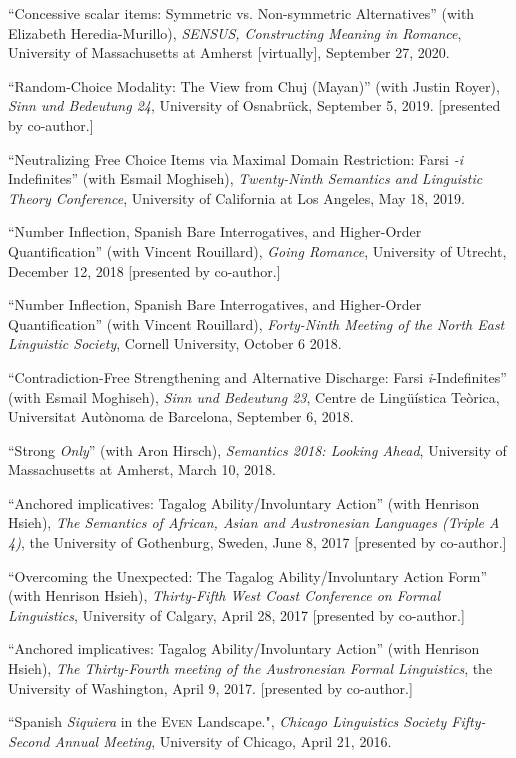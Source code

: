 \documentclass[11pt]{article}
\begin{document}
``Concessive scalar items: Symmetric vs. Non-symmetric Alternatives'' (with Elizabeth Heredia-Murillo), \textit{SENSUS, Constructing Meaning in Romance}, University of Massachusetts at Amherst [virtually], September 27, 2020.

``Random-Choice Modality: The View from Chuj (Mayan)'' (with Justin Royer), \textit{Sinn und Bedeutung 24}, University of Osnabr\"{u}ck, September 5, 2019. [presented by co-author.]

``Neutralizing Free Choice Items via Maximal Domain Restriction: Farsi \textit{-i} Indefinites'' (with Esmail Moghiseh), \textit{Twenty-Ninth Semantics and Linguistic Theory Conference}, University of California at Los Angeles, May 18, 2019.

``Number Inflection, Spanish Bare Interrogatives, and Higher-Order Quantification'' (with Vincent Rouillard), \textit{Going Romance}, University of Utrecht, December 12, 2018 [presented by co-author.]

``Number Inflection, Spanish Bare Interrogatives, and Higher-Order Quantification'' (with Vincent Rouillard), \textit{Forty-Ninth
  Meeting of the North East Linguistic Society}, Cornell University, October 6 2018.

``Contradiction-Free Strengthening and Alternative Discharge: Farsi \textit{i}-Indefinites'' (with Esmail Moghiseh), \textit{Sinn und Bedeutung 23}, Centre de Ling\"{u}\'istica Te\`orica, Universitat Aut\`onoma de Barcelona, September 6, 2018.
 
``Strong \textit{Only}'' (with Aron Hirsch), \textit{Semantics 2018: Looking Ahead}, University of Massachusetts at Amherst, March 10, 2018.
 

``Anchored implicatives: Tagalog Ability/Involuntary Action'' (with Henrison Hsieh), \textit{The Semantics of African, Asian and Austronesian Languages (Triple A 4)}, the University of Gothenburg, Sweden, June 8, 2017 [presented by co-author.]

``Overcoming the Unexpected: The Tagalog Ability/Involuntary Action Form'' (with Henrison Hsieh),  \textit{Thirty-Fifth West Coast Conference on Formal Linguistics}, University of Calgary, April 28, 2017 [presented by co-author.]


``Anchored implicatives: Tagalog Ability/Involuntary Action'' (with Henrison Hsieh), \textit{The Thirty-Fourth meeting of the Austronesian Formal Linguistics}, the University of Washington, April 9, 2017. [presented by co-author.]

``Spanish \textit{Siquiera} in the \textsc{Even} Landscape.", \textit{Chicago Linguistics Society Fifty-Second Annual Meeting}, University of Chicago, April 21, 2016. 
\end{document}
